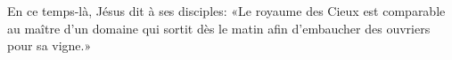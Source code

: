En ce temps-là, Jésus dit à ses disciples:
	«Le royaume des Cieux est comparable au maître d’un domaine
	qui sortit dès le matin afin d’embaucher des ouvriers pour sa vigne.»
